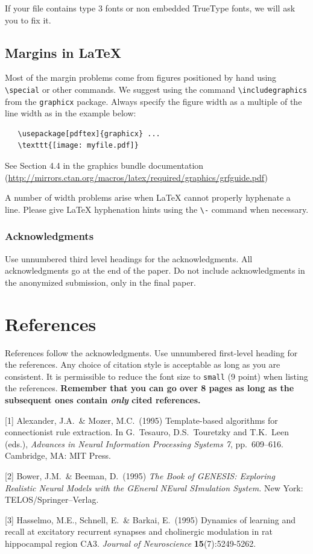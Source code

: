 \documentclass{article}
\begin{document}
If your file contains type 3 fonts or non embedded TrueType fonts, we
will ask you to fix it.

\subsection{Margins in \LaTeX{}}

Most of the margin problems come from figures positioned by hand using
\verb+\special+ or other commands. We suggest using the command
\verb+\includegraphics+ from the \verb+graphicx+ package. Always
specify the figure width as a multiple of the line width as in the
example below:
\begin{verbatim}
   \usepackage[pdftex]{graphicx} ...
   \texttt{[image: myfile.pdf]}
\end{verbatim}
See Section 4.4 in the graphics bundle documentation
(\url{http://mirrors.ctan.org/macros/latex/required/graphics/grfguide.pdf})

A number of width problems arise when \LaTeX{} cannot properly
hyphenate a line. Please give LaTeX hyphenation hints using the
\verb+\-+ command when necessary.

\subsubsection*{Acknowledgments}

Use unnumbered third level headings for the acknowledgments. All
acknowledgments go at the end of the paper. Do not include
acknowledgments in the anonymized submission, only in the final paper.

\section*{References}

References follow the acknowledgments. Use unnumbered first-level
heading for the references. Any choice of citation style is acceptable
as long as you are consistent. It is permissible to reduce the font
size to \verb+small+ (9 point) when listing the references. {\bf
  Remember that you can go over 8 pages as long as the subsequent ones contain
  \emph{only} cited references.}
\medskip

\small

[1] Alexander, J.A.\ \& Mozer, M.C.\ (1995) Template-based algorithms
for connectionist rule extraction. In G.\ Tesauro, D.S.\ Touretzky and
T.K.\ Leen (eds.), {\it Advances in Neural Information Processing
  Systems 7}, pp.\ 609--616. Cambridge, MA: MIT Press.

[2] Bower, J.M.\ \& Beeman, D.\ (1995) {\it The Book of GENESIS:
  Exploring Realistic Neural Models with the GEneral NEural SImulation
  System.}  New York: TELOS/Springer--Verlag.

[3] Hasselmo, M.E., Schnell, E.\ \& Barkai, E.\ (1995) Dynamics of
learning and recall at excitatory recurrent synapses and cholinergic
modulation in rat hippocampal region CA3. {\it Journal of
  Neuroscience} {\bf 15}(7):5249-5262.
\end{document}

